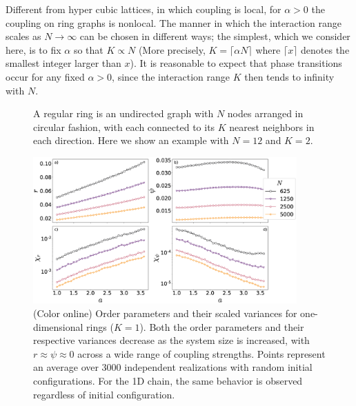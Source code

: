 Different from hyper cubic lattices, in which coupling is local, for $\alpha > 0$ the coupling on ring graphs is nonlocal.  The manner
in which the interaction range scales as $N\to\infty$ can be chosen in different ways; the simplest, which we consider here, is to fix
$\alpha$ so that $K \propto N$ (More precisely,  $K=\lceil\alpha N\rceil$ where $\lceil x \rceil$ denotes the smallest integer larger
than $x$).  It is reasonable to expect that phase transitions occur for any fixed $\alpha > 0$, since the interaction range $K$ then
tends to infinity with $N$. 

\begin{figure}[b]
\begin{center}
\caption{\label{fig:ring}
    A regular ring is an undirected graph with $N$ nodes arranged in circular
    fashion, with each connected to its $K$ nearest neighbors in each direction.
    Here we show an example with $N=12$ and $K=2$.
    }
\end{center}
\end{figure}

\begin{figure}[t]
\begin{center}
    \includegraphics[width=0.9\textwidth]{fig/chi_curves_1D.eps}
\caption{\label{fig:chi_curves_1D}
    (Color online) Order parameters and their scaled variances for
    one-dimensional rings ($K=1$). Both the order parameters and their
    respective variances decrease as the system size is increased, with $r
    \approx \psi \approx 0$ across a wide range of coupling strengths. Points
    represent an average over 3000 independent realizations with random initial
    configurations. For the 1D chain, the same behavior is observed regardless
    of initial configuration.
    }
\end{center}
\end{figure}

